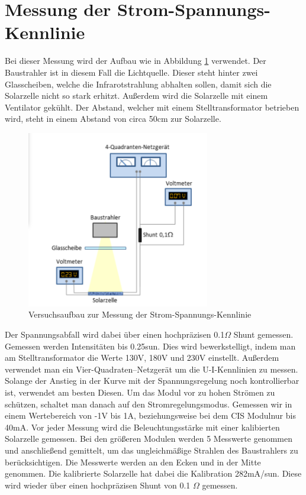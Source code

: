 \section{Messung der Strom-Spannungs-Kennlinie}

Bei dieser Messung wird der Aufbau wie in Abbildung \ref{Versuch2} verwendet. Der Baustrahler ist in diesem Fall die Lichtquelle. Dieser steht hinter zwei 
Glasscheiben, welche die Infrarotstrahlung abhalten sollen, damit sich die Solarzelle nicht so stark erhitzt. Außerdem wird die Solarzelle mit 
einem Ventilator gekühlt. Der Abstand, welcher mit einem Stelltransformator betrieben wird, steht in einem Abstand von circa 50cm zur Solarzelle. 
 
\begin{figure}[ht]
    \captionsetup{justification=centering,margin=2cm}
    \centering
    \includegraphics[width =8cm]{Bilder/Versuchsaufbau2.png}
    \caption{Versuchsaufbau zur Messung der Strom-Spannungs-Kennlinie}
    \label{Versuch2}
\end{figure}

Der Spannungsabfall wird dabei über einen hochpräzisen 0.1$\Omega$ Shunt gemessen. 
Gemessen werden Intensitäten bis 0.25sun. Dies wird bewerkstelligt, indem man am Stelltransformator die Werte 130V, 180V und 230V einstellt.
Außerdem verwendet man ein Vier-Quadraten--Netzgerät um die U-I-Kennlinien zu messen. Solange der Anstieg in der Kurve mit der Spannungsregelung noch kontrollierbar ist,
 verwendet am besten Diesen. Um das Modul vor zu hohen Strömen zu schützen, schaltet man danach auf den Stromregelungsmodus.
Gemessen wir in einem Wertebereich von -1V bis 1A, beziehungsweise bei dem CIS Modulnur bis 40mA.
Vor jeder Messung wird die Beleuchtungsstärke mit einer kalibierten Solarzelle gemessen. Bei den größeren Modulen werden 5 Messwerte genommen 
und anschließend gemittelt, um das ungleichmäßige Strahlen des Baustrahlers zu berücksichtigen. Die Messwerte werden an den Ecken und in der Mitte genommen. 
Die kalibrierte Solarzelle hat dabei die Kalibration 282mA/sun. Diese wird wieder über einen hochpräzisen Shunt von 0.1 $\Omega$ gemessen. 

